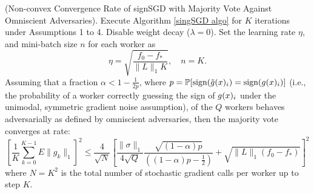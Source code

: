 \begin{theorem} \textnormal{(Non-convex Convergence Rate of signSGD with Majority Vote Against Omniscient Adversaries).}
Execute Algorithm \ref{singSGD algo} for $K$ iterations under Assumptions 1 to 4. Disable weight decay ($\lambda = 0$). Set the learning rate $\eta$, and mini-batch size $n$ for each worker as
\begin{equation*}
    \eta = \sqrt{\frac{f_0 - f_*}{\|L\|_{1}K}}, \quad n = K.
\end{equation*}
Assuming that a fraction $\alpha < 1 - \frac{1}{2p}$, where $p = \mathbb{P}[\text{sign}(\tilde{g}(x)_i) = \text{sign}(g(x)_i)]$ (i.e., the probability of a worker correctly guessing the sign of $g(x)_i$ under the unimodal, symmetric gradient noise assumption), of the $Q$ workers behaves adversarially as defined by omniscient adversaries, then the majority vote converges at rate:
\begin{equation*}
  \left[\frac{1}{K}\sum^{K - 1}_{k = 0} E\|g_k\|_1\right]^2 \leq \frac{4}{\sqrt{N}}  \left[\frac{\|\sigma\|_1}{4\sqrt{Q}}\frac{\sqrt{(1- \alpha)p}}{((1 - \alpha)p - \frac{1}{2})}  + \sqrt{\|L\|_1(f_0 - f_*)} \right] ^2
\end{equation*}
where $N=K^2$ is the total number of stochastic gradient calls per worker up to step $K$.
\end{theorem}


